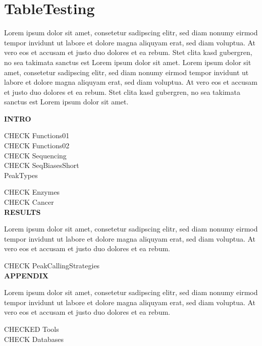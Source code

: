 \chapter{TableTesting}

Lorem ipsum dolor sit amet, consetetur sadipscing elitr, sed diam nonumy eirmod tempor invidunt ut labore et dolore magna aliquyam erat, sed diam voluptua. At vero eos et accusam et justo duo dolores et ea rebum. Stet clita kasd gubergren, no sea takimata sanctus est Lorem ipsum dolor sit amet. Lorem ipsum dolor sit amet, consetetur sadipscing elitr, sed diam nonumy eirmod tempor invidunt ut labore et dolore magna aliquyam erat, sed diam voluptua. At vero eos et accusam et justo duo dolores et ea rebum. Stet clita kasd gubergren, no sea takimata sanctus est Lorem ipsum dolor sit amet.

\textbf{INTRO}

CHECK Functions01\\


CHECK Functions02\\



CHECK Sequencing\\


CHECK SeqBiasesShort\\


PeakTypes

CHECK Enzymes \\


CHECK Cancer \\


\textbf{RESULTS}

Lorem ipsum dolor sit amet, consetetur sadipscing elitr, sed diam nonumy eirmod tempor invidunt ut labore et dolore magna aliquyam erat, sed diam voluptua. At vero eos et accusam et justo duo dolores et ea rebum.

CHECK PeakCallingStrategies\\



\textbf{APPENDIX}

Lorem ipsum dolor sit amet, consetetur sadipscing elitr, sed diam nonumy eirmod tempor invidunt ut labore et dolore magna aliquyam erat, sed diam voluptua. At vero eos et accusam et justo duo dolores et ea rebum.


CHECKED Tools \\



CHECK Databases \\


%


